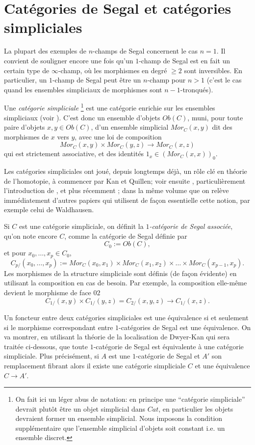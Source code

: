 \documentclass[12pt]{article}
\newcommand{\numero}[1]{\newpage\section{#1}}
\begin{document}
\numero{Cat\'egories de Segal et cat\'egories simpliciales}

\label{segsimplpage}

La plupart des exemples de $n$-champs de Segal concernent le cas $n=1$.
Il convient de souligner encore une fois qu'un $1$-champ de Segal est en
fait un certain type de $\infty$-champ, o\`u les morphismes en degr\'e $\geq 2$
sont inversibles. En particulier, un $1$-champ de Segal peut \^etre un $n$-champ
pour $n>1$ (c'est le cas quand les ensembles simpliciaux de morphismes sont
$n-1$-tronqu\'es).


Une {\em cat\'egorie simpliciale}
\footnote{On fait ici un l\'eger abus de notation: en principe
une ``cat\'egorie simpliciale'' devrait plut\^ot
\^etre un objet simplicial dans $Cat$,
en particulier les objets devraient former
un ensemble simplicial. Nous
imposons la condition suppl\'ementaire
que l'ensemble simplicial d'objets soit constant i.e. un
ensemble
discret.}
est une cat\'egorie enrichie sur les ensembles
simpliciaux (voir \cite{Kelly}). C'est donc un ensemble d'objets
$Ob(C)$, muni, pour toute paire d'objets $x,y\in Ob(C)$, d'un ensemble
simplicial
$Mor_C(x,y)$ dit des morphismes de $x$ vers $y$, avec une loi de composition
$$
Mor_C(x,y)\times Mor_C(y,z)\rightarrow Mor_C(x,z)
$$
qui est strictement associative, et des identit\'es $1_x\in
(Mor_C(x,x))_0$.

Les cat\'egories simpliciales
ont jou\'e, depuis longtemps d\'ej\`a, un r\^ole
cl\'e en th\'eorie de l'homotopie, \`a commencer par Kan et Quillen; voir
ensuite
\cite{DwyerKan1} \cite{DwyerKan2} \cite{DwyerKan3}, particuli\`erement
l'introduction de
\cite{DwyerKanDiags}, et plus r\'ecemment \cite{DHK}; dans la m\^eme volume que
\cite{DwyerKanDiags} on rel\`eve imm\'ediatement d'autres papiers qui utilisent
de fa\c{c}on essentielle cette notion, par exemple celui de Waldhausen.

Si $C$ est une cat\'egorie simpliciale, on d\'efinit la {\em $1$-cat\'egorie de
Segal associ\'ee}, qu'on note encore $C$, comme la cat\'egorie de Segal
d\'efinie par
$$
C_0:= Ob(C),
$$
et  pour $x_0,\ldots , x_p\in C_0$,
$$
C_{p/}(x_0,\ldots ,x_p):= Mor_C(x_0,x_1)\times Mor _C(x_1,x_2)\times \ldots
\times Mor_C(x_{p-1},x_p).
$$
Les morphismes de la structure simpliciale sont d\'efinis (de fa\c{c}on
\'evidente)
en utilisant la composition en cas de besoin. Par exemple, la composition
elle-m\^eme devient le morphisme de face $02$
$$
C_{1/}(x,y)\times C_{1/}(y,z)=C_{2/}(x,y,z)\rightarrow C_{1/}(x,z).
$$

Un foncteur entre deux cat\'egories simpliciales est une \'equivalence si et
seulement si le morphisme correspondant entre $1$-cat\'egories de Segal est une
\'equivalence. On va montrer, en utilisant la th\'eorie de la localisation de
Dwyer-Kan qui sera trait\'ee ci-dessous, que toute $1$-cat\'egorie de Segal est
\'equivalente \`a une cat\'egorie simpliciale. Plus
pr\'ecis\'ement, si $A$ est une $1$-cat\'egorie de Segal et $A'$ son
remplacement fibrant alors  il existe une cat\'egorie simpliciale
$C$ et une
\'equivalence $C\rightarrow A'$.
\end{document}
